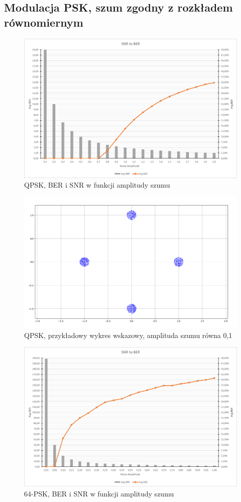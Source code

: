\documentclass{article}
\begin{document}
	\subsection{Modulacja PSK, szum zgodny z rozkładem równomiernym}
		\begin{figure}[H]
			\centering
			\includegraphics[width=0.8\linewidth]{img/chart/qpsk_snr_ber_uni.png}
			\caption{QPSK, BER i SNR w funkcji amplitudy szumu}
			\label{fig:qpsk_snr_ber_uni}
		\end{figure}

		\begin{figure}[H]
			\centering
			\includegraphics[width=0.8\linewidth]{img/chart/qpsk_var01_const_uni.png}
			\caption{QPSK, przykładowy wykres wskazowy, amplituda szumu równa 0,1}
			\label{fig:qpsk_const_uni}
		\end{figure}

		\begin{figure}[H]
			\centering
			\includegraphics[width=0.8\linewidth]{img/chart/64psk_snr_ber_uni.png}
			\caption{64-PSK, BER i SNR w funkcji amplitudy szumu}
			\label{fig:64psk_snr_ber_uni}
		\end{figure}
\end{document}
